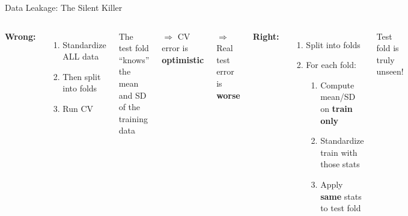 \documentclass[aspectratio=169, 11pt]{beamer}
\begin{document}
\begin{frame}{Data Leakage: The Silent Killer}

\begin{columns}
\textbf{\textcolor{softred}{Wrong:}}

\begin{enumerate}
  \item Standardize ALL data
  \item Then split into folds
  \item Run CV
\end{enumerate}

\vspace{0.2em}
The test fold ``knows'' the mean and SD of the training data

$\Rightarrow$ CV error is \textbf{optimistic}

$\Rightarrow$ Real test error is \textbf{worse}

\textbf{\textcolor{softgreen}{Right:}}

\begin{enumerate}
  \item Split into folds
  \item For each fold:
  \begin{enumerate}
    \item[a.] Compute mean/SD on \textbf{train only}
    \item[b.] Standardize train with those stats
    \item[c.] Apply \textbf{same} stats to test fold
  \end{enumerate}
\end{enumerate}

\vspace{0.2em}
Test fold is truly unseen!
\end{columns}

\vspace{0.5em}
\centering
{}
\end{frame}
\end{document}
